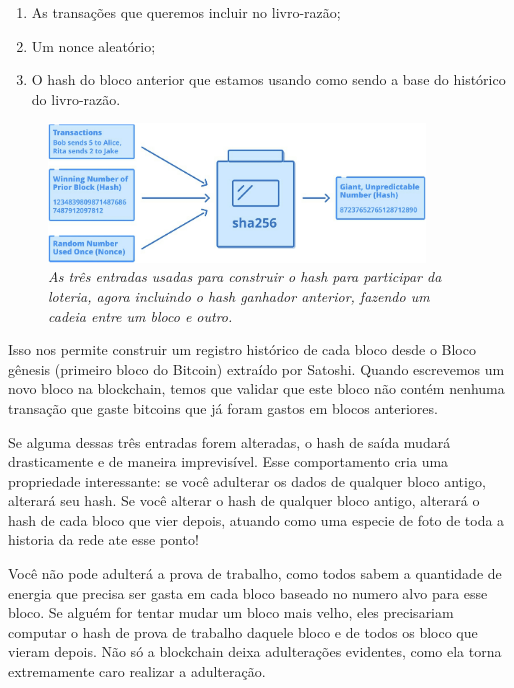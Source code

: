 \begin{samepage}
\begin{enumerate}
\item As transações que queremos incluir no livro-razão;
\item Um nonce aleatório;
\item O hash do bloco anterior que estamos usando como sendo a base do histórico do livro-razão.
\end{enumerate}
\end{samepage}

\begin{figure}[ht]
  \centering
  \includegraphics[width=10cm]{imagens/capitulo6/capitulo6Sha256.png}
  \caption*{\textit{\small As três entradas usadas para construir o hash para participar da loteria, agora incluindo o hash ganhador anterior, fazendo um cadeia entre um bloco e outro.}}
\end{figure}

Isso nos permite construir um registro histórico de cada bloco desde o Bloco gênesis (primeiro bloco do Bitcoin) extraído por Satoshi.
Quando escrevemos um novo bloco na blockchain, temos que validar que este bloco não contém nenhuma transação que gaste bitcoins que já foram gastos em blocos anteriores.

Se alguma dessas três entradas forem alteradas, o hash de saída mudará drasticamente e de maneira imprevisível. Esse comportamento cria uma propriedade interessante: se você adulterar os dados de qualquer bloco antigo, alterará seu hash. Se você alterar o hash de qualquer bloco antigo, alterará o hash de cada bloco que vier depois, atuando como uma especie de foto de toda a historia da rede ate esse ponto!


Você não pode adulterá a prova de trabalho, como todos sabem a quantidade de energia que precisa ser gasta em cada bloco baseado no numero alvo para esse bloco. Se alguém for tentar mudar um bloco mais velho, eles precisariam computar o hash de prova de trabalho daquele bloco e de todos os bloco que vieram depois. Não só a blockchain deixa adulterações evidentes, como ela torna extremamente caro realizar a adulteração.

